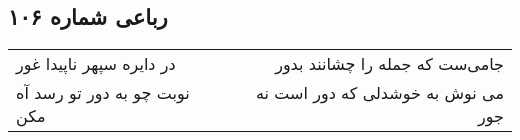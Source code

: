 \begin{center}
\section*{رباعی شماره ۱۰۶}
\label{sec:sh106}
\begin{longtable}{l p{0.5cm} r}
در دایره سپهر ناپیدا غور
&&
جامی‌ست که جمله را چشانند بدور
\\
نوبت چو به دور تو رسد آه مکن
&&
می نوش به خوشدلی که دور است نه جور
\\
\end{longtable}
\end{center}
